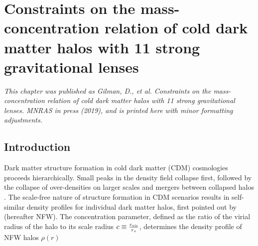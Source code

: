 \def\rein{{$R_{\rm{Ein}}$}}
\def\cmg{{\rm{$\rm{cm}^2 \rm{g}^{-1}$}}}
\def\msun{{M_{\odot}}}
\def\sigmasidm{{$\sigma_{\rm{SIDM}}$}}
\def\dlos{{\delta_{\rm{los}}}}
\def\mhm{{m_{\rm{hm}}}}

\def\sevenonesigma{{$c = 15_{-8}^{+9}$}}
\def\eightonesigma{{$c = 12_{-5}^{+6}$}}
\def\nineonesigma{{$c = 10_{-4}^{+7}$}}

\def\seventwosigma{{$c = 15_{-11}^{+18}$}}
\def\eighttwosigma{{$c = 12_{-9}^{+15}$}}
\def\ninetwosigma{{$c = 10_{-7}^{+14}$}}

\def\data{{\bf{d}_{\rm{n}}}}
\def\datasim{{\bf{d}_{\rm{n}}^{\prime}}}
\def\msub{{\bf{m}_{\rm{sub}}}}
\def\qsub{{\bf{q}_{\rm{s}}}}
\def\fsub{{{f}_{\rm{sub}}}}
\def\fsubmean{{\bar{f}_{\rm{sub}}}}
\def\qmac{{\bf{M}}}
\def\qm{{}{\bf{M}}}
\def\sigmasubmean{0.035 \rm{kpc^{-2}}}
\def\sigmasubonesigma{0.025 < \Sigma_{\rm{sub}} < 0.05 \rm{kpc^{-2}}}
\def\sigmasubtwosigma{0.01 < \Sigma_{\rm{sub}} < 0.075 \rm{kpc^{-2}}}
\def\msubmean{3.9 \times 10^7 \msun \rm{kpc^{-2}}}
\def\msubonesigmalow{2.8 \times 10^7 \msun \rm{kpc^{-2}}}
\def\msubonesigmahigh{5.8 \times 10^7 \msun \rm{kpc^{-2}}}
\def\msubtwosigmalow{1.1 \times 10^7 \msun \rm{kpc^{-2}}}
\def\msubtwosigmalow{8.3 \times 10^7 \msun \rm{kpc^{-2}}}

\chapter{Constraints on the mass-concentration relation of cold dark matter halos with 11 strong gravitational lenses}
\textit{This chapter was published as Gilman, D., et al. Constraints on the mass-concentration relation of cold dark matter halos with 11 strong gravitational lenses. MNRAS in press (2019), and is printed here with minor formatting adjustments.}

\section{Introduction}
Dark matter structure formation in cold dark matter (CDM) cosmologies proceeds hierarchically. Small peaks in the density field collapse first, followed by the collapse of over-densities on larger scales and mergers between collapsed halos \cite{Navarro++97,Moore++99}. The scale-free nature of structure formation in CDM scenarios results in self-similar density profiles for individual dark matter halos, first pointed out by \cite{Navarro++96} (hereafter NFW). The concentration parameter, defined as the ratio of the virial radius of the halo to its scale radius $c \equiv \frac{r_{\rm{vir}}}{r_s}$, determines the density profile of NFW halos $\rho\left(r\right)$

